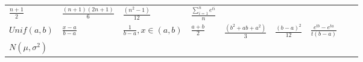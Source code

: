 \documentclass[]{tufte-book}
\begin{document}
\begin{longtable}[]{@{}lllllllll@{}}
\begin{minipage}[t]{0.08\columnwidth}
\(\frac{n+1}2\)\strut
\end{minipage} & \begin{minipage}[t]{0.08\columnwidth}\raggedright
\(\frac{(n+1)(2n+1)}{6}\)\strut
\end{minipage} & \begin{minipage}[t]{0.08\columnwidth}\raggedright
\(\frac{(n^2-1)}{12}\)\strut
\end{minipage} & \begin{minipage}[t]{0.08\columnwidth}\raggedright
\(\frac{\sum_{i=1}^n{e^{ti}}}n\)\strut
\end{minipage} & \begin{minipage}[t]{0.08\columnwidth}\raggedright
\strut
\end{minipage} & \begin{minipage}[t]{0.08\columnwidth}\raggedright
\strut
\end{minipage}\tabularnewline
\begin{minipage}[t]{0.08\columnwidth}\raggedright
\(Unif(a,b)\)\strut
\end{minipage} & \begin{minipage}[t]{0.08\columnwidth}\raggedright
\(\frac{x-a}{b-a}\)\strut
\end{minipage} & \begin{minipage}[t]{0.08\columnwidth}\raggedright
\(\frac{1}{b-a},x \in(a,b)\)\strut
\end{minipage} & \begin{minipage}[t]{0.08\columnwidth}\raggedright
\(\frac{a+b}{2}\)\strut
\end{minipage} & \begin{minipage}[t]{0.08\columnwidth}\raggedright
\(\frac{(b^2+ab+a^2)}{3}\)\strut
\end{minipage} & \begin{minipage}[t]{0.08\columnwidth}\raggedright
\(\frac{(b-a)^2}{12}\)\strut
\end{minipage} & \begin{minipage}[t]{0.08\columnwidth}\raggedright
\(\frac{e^{tb}-e^{ta}}{t(b-a)}\)\strut
\end{minipage} & \begin{minipage}[t]{0.08\columnwidth}\raggedright
\strut
\end{minipage} & \begin{minipage}[t]{0.08\columnwidth}\raggedright
\strut
\end{minipage}\tabularnewline
\begin{minipage}[t]{0.08\columnwidth}\raggedright
\(N(\mu,\sigma^2)\)\strut

\end{minipage}
\end{longtable}
\end{document}
